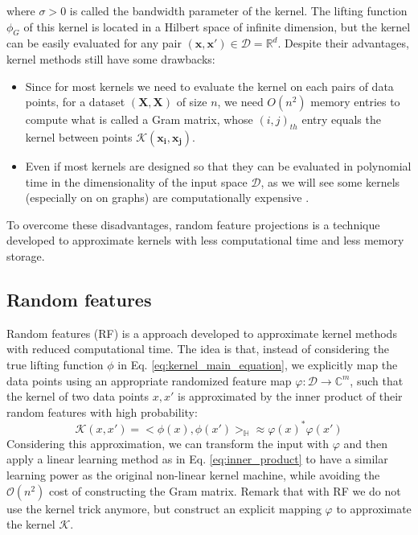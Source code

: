 where $\sigma>0$ is called the bandwidth parameter of the kernel. The lifting function $\phi_G$ of this kernel is located in a Hilbert space of infinite dimension, but the kernel can be easily evaluated for any pair $(\mathbf{x},\mathbf{x}')\in \mathcal{D}=\mathbb{R}^d$.\newline
Despite their advantages, kernel methods still have some drawbacks:
\begin{itemize}
    \item Since for most kernels we need to evaluate the kernel on each pairs of data points, for a dataset $(\mathbf{X},\mathbf{X})$ of size $n$, we need $O(n^2)$ memory entries to compute what is called a Gram matrix, whose $(i,j)_{th}$ entry equals the kernel between points $\mathcal{K}(\mathbf{x_i}, \mathbf{x_j})$.
    \item Even if most kernels are designed so that they can be evaluated in polynomial time in the dimensionality of the input space $\mathcal{D}$, as we will see some kernels (especially on on graphs) are computationally expensive \citep{graphlet_kernel}.
\end{itemize}
To overcome these disadvantages, random feature projections is a technique developed to approximate kernels with less computational time and less memory storage.

\subsection{Random features}
Random features (RF) \citep{rahimi2008random} is a approach developed to approximate kernel methods with reduced computational time. The idea is that, instead of considering the true lifting function $\phi$ in Eq. \ref{eq:kernel_main_equation}, we explicitly map the data points using an appropriate randomized feature map $\varphi:\mathcal{D} \xrightarrow{}\mathbb{C}^m$, such that the kernel of two data points $x, x'$ is approximated by the inner product of their random features with high probability:
\begin{equation}
\label{eq:approx_RF}
\mathcal{K}(x,x')=<\phi(x),\phi(x')>_\mathbb{H} \approx \varphi(x)^*\varphi(x')
\end{equation}
Considering this approximation, we can transform the input with $\varphi$ and then apply a linear learning method as in Eq. \ref{eq:inner_product} to have a similar learning power as the original non-linear kernel machine, while avoiding the $\mathcal{O}(n^2)$ cost of constructing the Gram matrix. Remark that with RF we do not use the kernel trick anymore, but construct an explicit mapping $\varphi$ to approximate the kernel $\mathcal{K}$.

